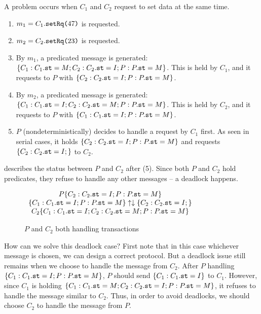 \documentclass[format=manuscript]{acmart}
\begin{document}
A problem occurs when $C_1$ and $C_2$ request to set data at the same time.

\begin{enumerate}
\item $m_1 = C_1.\texttt{setRq(}47\texttt{)}$ is requested.
\item $m_2 = C_2.\texttt{setRq(}23\texttt{)}$ is requested.
\item By $m_1$, a predicated message is generated: $\{ C_1: C_1.\texttt{st} = M; C_2:
  C_2.\texttt{st} = I; P: P.\texttt{st} = M \}$. This is held by $C_1$, and it requests to
  $P$ with $\{ C_2: C_2.\texttt{st} = I; P: P.\texttt{st} = M \}$.
\item By $m_2$, a predicated message is generated: $\{ C_1: C_1.\texttt{st} = I; C_2:
  C_2.\texttt{st} = M; P: P.\texttt{st} = M \}$. This is held by $C_2$, and it requests to
  $P$ with $\{ C_1: C_1.\texttt{st} = I; P: P.\texttt{st} = M \}$.
\item $P$ (nondeterministically) decides to handle a request by $C_1$ first. As
  seen in serial cases, it holds $\{ C_2: C_2.\texttt{st} = I; P: P.\texttt{st} = M \}$
  and requests $\{ C_2: C_2.\texttt{st} = I; \}$ to $C_2$.
\end{enumerate}

 describes the status between $P$ and $C_2$ after
(5). Since both $P$ and $C_2$ hold predicates, they refuse to handle any other
messages -- a deadlock happens.

\begin{figure}[h]
  \begin{math}
    \begin{array}{c}
      P \{ C_2: C_2.\texttt{st} = I; P: P.\texttt{st} = M \} \\
      \{ C_1: C_1.\texttt{st} = I; P: P.\texttt{st} = M \} \uparrow
      \downarrow \{ C_2: C_2.\texttt{st} = I; \} \\
      C_2 \{ C_1: C_1.\texttt{st} = I; C_2: C_2.\texttt{st} = M; P: P.\texttt{st} = M \}
    \end{array}
  \end{math}
  \caption{$P$ and $C_2$ both handling transactions}
  \label{fig:deadlock}
\end{figure}

How can we solve this deadlock case? First note that in this case whichever
message is chosen, we can design a correct protocol. But a deadlock issue still
remains when we choose to handle the message from $C_2$. After $P$ handling $\{
C_1: C_1.\texttt{st} = I; P: P.\texttt{st} = M \}$, $P$ should send $\{ C_1: C_1.\texttt{st} =
I \}$ to $C_1$. However, since $C_1$ is holding $\{ C_1: C_1.\texttt{st} = M; C_2:
C_2.\texttt{st} = I; P: P.\texttt{st} = M \}$, it refuses to handle the message similar to
$C_2$. Thus, in order to avoid deadlocks, we should choose $C_2$ to handle the
message from $P$.
\end{document}
